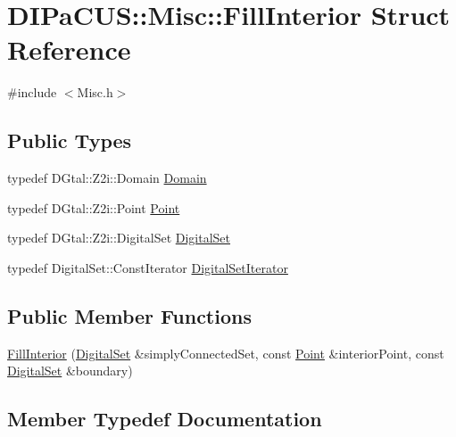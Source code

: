\hypertarget{structDIPaCUS_1_1Misc_1_1FillInterior}{}\section{D\+I\+Pa\+C\+US\+:\+:Misc\+:\+:Fill\+Interior Struct Reference}
\label{structDIPaCUS_1_1Misc_1_1FillInterior}


{\ttfamily \#include $<$Misc.\+h$>$}

\subsection*{Public Types}
\begin{DoxyCompactItemize}
\item 
typedef D\+Gtal\+::\+Z2i\+::\+Domain \hyperlink{structDIPaCUS_1_1Misc_1_1FillInterior_aede1ff20c08c25e284b03e8cafc7088b}{Domain}
\item 
typedef D\+Gtal\+::\+Z2i\+::\+Point \hyperlink{structDIPaCUS_1_1Misc_1_1FillInterior_a88bed595883eb022eb4e9f093ee00d18}{Point}
\item 
typedef D\+Gtal\+::\+Z2i\+::\+Digital\+Set \hyperlink{structDIPaCUS_1_1Misc_1_1FillInterior_a6fb325418d6c5f5e07619176576708aa}{Digital\+Set}
\item 
typedef Digital\+Set\+::\+Const\+Iterator \hyperlink{structDIPaCUS_1_1Misc_1_1FillInterior_ae4f166d1f35d29c577f5b653a4b9ceac}{Digital\+Set\+Iterator}
\end{DoxyCompactItemize}
\subsection*{Public Member Functions}
\begin{DoxyCompactItemize}
\item 
\hyperlink{structDIPaCUS_1_1Misc_1_1FillInterior_a05ba475a43a025a4d06577b3ad20e298}{Fill\+Interior} (\hyperlink{structDIPaCUS_1_1Misc_1_1FillInterior_a6fb325418d6c5f5e07619176576708aa}{Digital\+Set} \&simply\+Connected\+Set, const \hyperlink{structDIPaCUS_1_1Misc_1_1FillInterior_a88bed595883eb022eb4e9f093ee00d18}{Point} \&interior\+Point, const \hyperlink{structDIPaCUS_1_1Misc_1_1FillInterior_a6fb325418d6c5f5e07619176576708aa}{Digital\+Set} \&boundary)
\end{DoxyCompactItemize}


\subsection{Member Typedef Documentation}
\mbox{\label{structDIPaCUS_1_1Misc_1_1FillInterior_a6fb325418d6c5f5e07619176576708aa}} 
